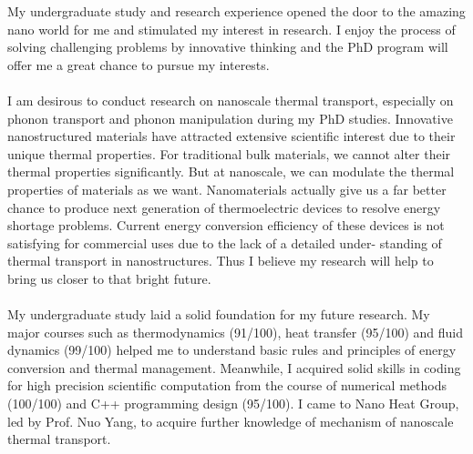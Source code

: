 \documentclass[a4paper,10pt]{article}
\begin{document}
\begin{spacing}{1.5}
\vspace{0.5em}
My undergraduate study and research experience opened the door to the amazing nano world for me and stimulated my interest in research. I enjoy the process of solving challenging problems by innovative thinking and the PhD program will offer me a great chance to pursue my interests.\\
\\
I am desirous to conduct research on nanoscale thermal transport, especially on phonon transport and phonon manipulation during my PhD studies. Innovative nanostructured materials have attracted extensive scientific interest due to their unique thermal properties. For traditional bulk materials, we cannot alter their thermal properties significantly. But at nanoscale, we can modulate the thermal properties of materials as we want. Nanomaterials actually give us a far better chance to produce next generation of thermoelectric devices to resolve energy shortage problems. Current energy conversion efficiency of these devices is not satisfying for commercial uses due to the lack of a detailed under- standing of thermal transport in nanostructures. Thus I believe my research will help to bring us closer to that bright future.\\
\\
My undergraduate study laid a solid foundation for my future research. My major courses such as thermodynamics (91/100), heat transfer (95/100) and fluid dynamics (99/100) helped me to understand basic rules and principles of energy conversion and thermal management. Meanwhile, I acquired solid skills in coding for high precision scientific computation from the course of numerical methods (100/100) and C++ programming design (95/100). I came to Nano Heat Group, led by Prof. Nuo Yang, to acquire further knowledge of mechanism of nanoscale thermal transport.\\
\\

\end{spacing}
\end{document}

